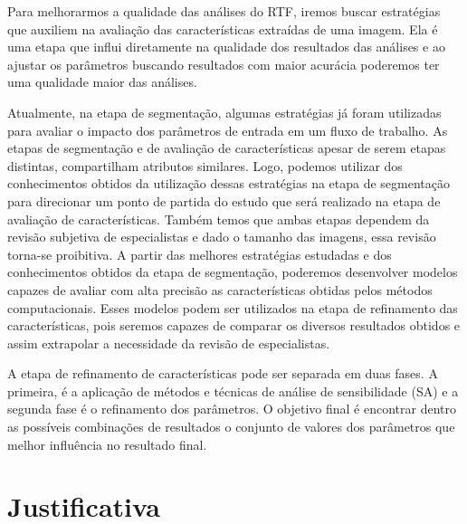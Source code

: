 \documentclass[a4paper,10pt]{article}
\begin{document}
Para melhorarmos a qualidade das análises do RTF, iremos buscar estratégias que auxiliem na avaliação das características extraídas de uma imagem. Ela é uma etapa que influi diretamente na qualidade dos resultados das análises e ao ajustar os parâmetros buscando resultados com maior acurácia poderemos ter uma qualidade maior das análises. 

Atualmente, na etapa de segmentação, algumas estratégias já foram utilizadas para avaliar o impacto dos parâmetros de entrada em um fluxo de trabalho. As etapas de segmentação e de avaliação de características apesar de serem etapas distintas, compartilham atributos similares. Logo, podemos utilizar dos conhecimentos obtidos da utilização dessas estratégias na etapa de segmentação para direcionar um ponto de partida do estudo que será realizado na etapa de avaliação de características. Também temos que ambas etapas dependem da revisão subjetiva de especialistas e dado o tamanho das imagens, essa revisão torna-se proibitiva. A partir das melhores estratégias estudadas e dos conhecimentos obtidos da etapa de segmentação, poderemos desenvolver modelos capazes de avaliar com alta precisão as características obtidas pelos métodos computacionais. Esses modelos podem ser utilizados na etapa de refinamento das características, pois seremos capazes de comparar os diversos resultados obtidos e assim extrapolar a necessidade da revisão de especialistas.

A etapa de refinamento de características pode ser separada em duas fases. A primeira, é a aplicação de métodos e técnicas de análise de sensibilidade (SA) e a segunda fase é o refinamento dos parâmetros. O objetivo final é encontrar dentro as possíveis combinações de resultados o conjunto de valores dos parâmetros que melhor influência no resultado final.



\section{Justificativa}
\end{document}
